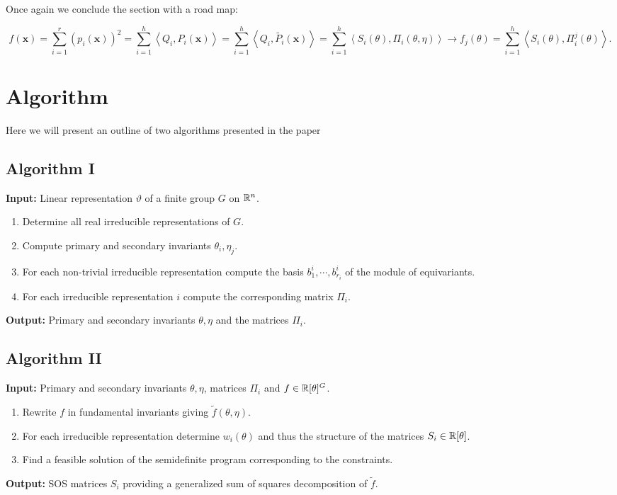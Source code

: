 \documentclass[]{article}
\begin{document}
Once again we conclude the section with a road map:

\[f(\mathbf{x}) = \sum_{i= 1}^{r} (p_i(\mathbf{x}))^2 
                = \sum_{i=1}^{h}\left<Q_i,P_i(\mathbf{x})\right> 
                = \sum_{i=1}^{h}\left<Q_i,\tilde{P_i}(\mathbf{x})\right>
                = \sum_{i=1}^{h}\left<S_i(\theta),\Pi_i(\theta,\eta)\right> 
                \rightarrow f_j(\theta) = \sum_{i=1}^{h}\left<S_i(\theta),\Pi_i^j(\theta)\right> . \]

\section*{Algorithm}
Here we will present an outline of two algorithms presented in the paper
\subsection*{Algorithm I}


\textbf{Input:} Linear representation $\vartheta$ of a finite group $G$ on $\mathbb R^n$.

\begin{enumerate}
    \item Determine all real irreducible representations of $G$.
    \item Compute primary and secondary invariants $\theta_i,\eta_j$. 
    \item For each non-trivial irreducible representation compute the basis $b_1^i,\cdots, b_{r_i}^i$ of the module of equivariants.
    \item For each irreducible representation $i$ compute the corresponding matrix $\Pi_i$.
\end{enumerate}
\noindent
\textbf{Output:} Primary and secondary invariants $\theta,\eta$ and the matrices $\Pi_i$.

\subsection*{Algorithm II}

\textbf{Input: } Primary and secondary invariants $\theta,\eta$, matrices $\Pi_i$ and $f \in \mathbb R[\theta]^G$.

\begin{enumerate}
    \item Rewrite $f$ in fundamental invariants giving $\tilde{f}(\theta,\eta)$.
    \item For each irreducible representation determine $w_i(\theta)$ and thus the structure of the matrices $S_i\in \mathbb R[\theta]$. %
    \item Find a feasible solution of the semidefinite program corresponding to the constraints.
\end{enumerate}
\noindent
\textbf{Output:} SOS matrices $S_i$ providing a generalized sum of squares decomposition of $\tilde{f}$.\\
\end{document}
